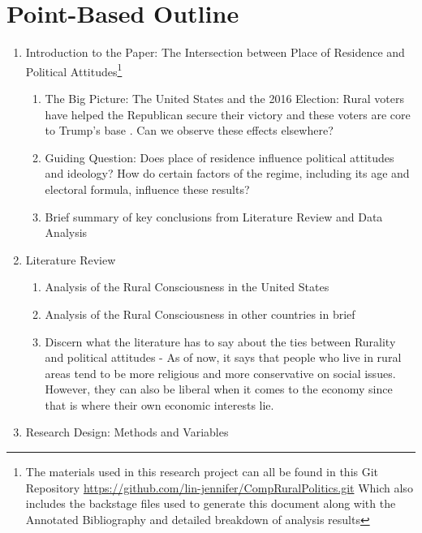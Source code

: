\documentclass[12pt]{article}
\title{\tb{Place of Residence and Political Attitudes in Democracies Worldwide \\ {\large Point-Based Outline} }}
\author{Jennifer Lin}
\affil{Transitions to Democracy}
\begin{document}
\maketitle 

\section{Point-Based Outline}

\begin{enumerate}
\item Introduction to the Paper: The Intersection between Place of Residence and Political Attitudes\footnote{The materials used in this research project can all be found in this Git Repository \url{https://github.com/lin-jennifer/CompRuralPolitics.git} Which also includes the backstage files used to generate this document along with the Annotated Bibliography and detailed breakdown of analysis results}
\begin{enumerate}
	\item The Big Picture: The United States and the 2016 Election: Rural voters have helped the Republican secure their victory and these voters are core to Trump's base \citep{walsh_putting_2012}. Can we observe these effects elsewhere?
	\item Guiding Question: Does place of residence influence political attitudes and ideology? How do certain factors of the regime, including its age and electoral formula, influence these results?
	\item Brief summary of key conclusions from Literature Review and Data Analysis
\end{enumerate}
\item Literature Review
\begin{enumerate}
	\item Analysis of the Rural Consciousness in the United States
	\item Analysis of the Rural Consciousness in other countries in brief
	\item Discern what the literature has to say about the ties between Rurality and political attitudes - As of now, it says that people who live in rural areas tend to be more religious and more conservative on social issues. However, they can also be liberal when it comes to the economy since that is where their own economic interests lie.
\end{enumerate}
\item Research Design: Methods and Variables 
\begin{enumerate}

\end{enumerate}
\end{enumerate}
\end{document}
